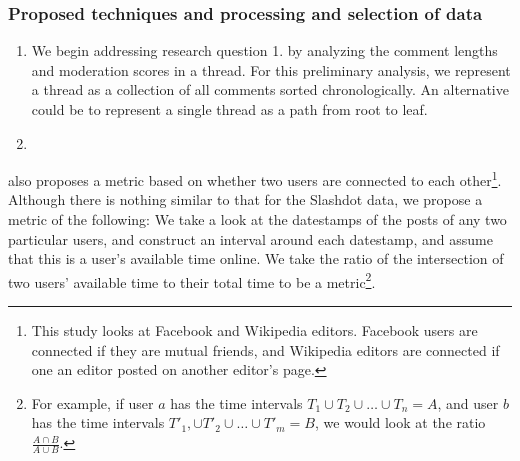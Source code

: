 \documentclass[a4paper,12pt]{article}
\numberwithin{equation}{section}
\begin{document}



\subsubsection*{Proposed techniques and processing and selection of data}
\begin{enumerate}
\item We begin addressing research question 1. by analyzing the comment lengths and moderation scores in a thread. For this preliminary analysis, we represent a thread as a collection of all comments sorted chronologically. An alternative could be to represent a single thread as a path from root to leaf. 






\item 
\end{enumerate}




\cite{Backstrom+al:13a} also proposes a metric based on whether two users are connected to each other\footnote{This study looks at Facebook and Wikipedia editors. Facebook users are connected if they are mutual friends, and Wikipedia editors are connected if one an editor posted on another editor's page.}. Although there is nothing similar to that for the Slashdot data, we propose a metric of the following: We take a look at the datestamps of the posts of any two particular users, and construct an interval around each datestamp, and assume that this is a user's available time online. We take the ratio of the intersection of two users' available time to their total time to be a metric\footnote{For example, if user $a$ has the time intervals $T_1 \cup T_2 \cup \hdots \cup T_n = A$, and user $b$ has the time intervals $T'_1, \cup T'_2 \cup \hdots \cup T'_m = B$, we would look at the ratio $\frac{A \cap B}{A \cup B}$. }. 
\end{document}
